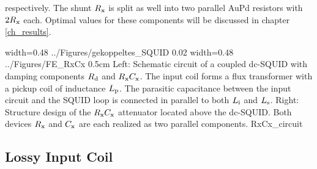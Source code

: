 respectively. The shunt $R_{\rm x}$ is split as well into two parallel AuPd resistors with $2R_{\rm x}$ each. Optimal values for these components will be discussed in chapter \ref{ch_results}.

{width=0.48\textwidth}
{../Figures/gekoppeltes_SQUID}
{0.02\textwidth} %
{width=0.48\textwidth}
{../Figures/FE_RxCx}
{0.5cm} %
{Left: Schematic circuit of a coupled dc-SQUID with damping components $R_{\rm d}$ and $R_{\rm x}C_{\rm x}$. The input coil forms a flux transformer with a pickup coil of inductance $L_{\rm p}$. The parasitic capacitance between the input circuit and the SQUID loop is connected in parallel to both $L_{\rm i}$ and $L_{\rm s}$. Right: Structure design of the $R_{\rm x}C_{\rm x}$ attenuator located above the dc-SQUID. Both devices $R_{\rm x}$ and $C_{\rm x}$ are each realized as two parallel components.}
{RxCx_circuit}

\subsection{Lossy Input Coil}\label{subsec_L_FE}

